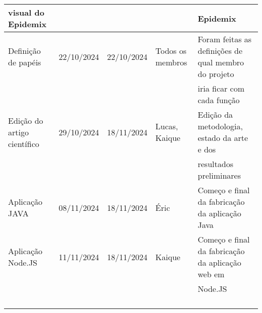 \documentclass[
landscape,
  a4paper,%
  12pt,%
  english,%
  brazilian,%
]{article}
\begin{document}
\begin{table}[]
\begin{tabular}{|l|l|l|l|l|}
visual do Epidemix          &                &                 &                            & Epidemix                                            \\ \hline
Definição de papéis         & 22/10/2024     & 22/10/2024      &Todos os membros            & Foram feitas as definições de qual membro do projeto\\ 
                            &                &                 &                            & iria ficar com cada função                          \\ \hline
Edição do artigo científico & 29/10/2024     & 18/11/2024      & Lucas, Kaique              & Edição da metodologia, estado da arte e dos         \\ 
                            &                &                 &                            & resultados preliminares                             \\ \hline
Aplicação JAVA              & 08/11/2024     & 18/11/2024      & Éric                       & Começo e final da fabricação da aplicação Java      \\ \hline
Aplicação Node.JS           & 11/11/2024     & 18/11/2024      & Kaique                     & Começo e final da fabricação da aplicação web em    \\ 
                            &                &                 &                            & Node.JS                                             \\ \hline
                            &                &                 &                            &                                                     \\ \hline
                            &                &                 &                            &                                                     \\ \hline
                            &                &                 &                            &                                                     \\ \hline
                            &                &                 &                            &                                                     \\ \hline
\end{tabular} 
\end{table}
\end{document}
